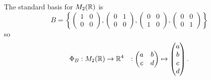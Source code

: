\documentclass[10pt, a4paper]{article}
\begin{document}
\begin{example}
    The standard basis for $M_2(\mathbb{R})$ is
    \[
    B = \left\{\begin{pmatrix}
        1 & 0 \\ 0 & 0
    \end{pmatrix}, \begin{pmatrix}
        0 & 1 \\ 0 & 0
    \end{pmatrix}, \begin{pmatrix}
        0 & 0 \\ 1 & 0
    \end{pmatrix}, \begin{pmatrix}
        0 & 0 \\ 0 & 1
    \end{pmatrix}\right\}
    \]
    so
    \begin{align*}
        \Phi_B &: M_2(\mathbb{R}) \rightarrow \mathbb{R} ^ 4
        &: \begin{pmatrix}
        a & b \\ c & d
        \end{pmatrix}
        \mapsto \begin{pmatrix}
            a \\ b \\ c \\ d
        \end{pmatrix}.
    \end{align*}


\end{example}
\end{document}

